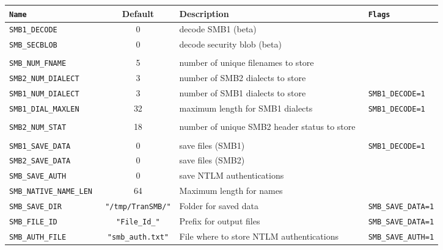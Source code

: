 \documentclass[documentation]{subfiles}
\begin{document}
\begin{longtable}{>{\tt}lcl>{\tt\small}l}
    \toprule
    {\bf Name} & {\bf Default} & {\bf Description} & {\bf Flags}\\
    \midrule\endhead%
    SMB1\_DECODE           & 0                                & decode SMB1 (beta)                                 & \\
    SMB\_SECBLOB           & 0                                & decode security blob (beta)                        & \\
    \\
    SMB\_NUM\_FNAME        & 5                                & number of unique filenames to store                & \\
    SMB2\_NUM\_DIALECT     & 3                                & number of SMB2 dialects to store                   & \\
    SMB1\_NUM\_DIALECT     & 3                                & number of SMB1 dialects to store                   & SMB1\_DECODE=1\\
    SMB1\_DIAL\_MAXLEN     & 32                               & maximum length for SMB1 dialects                   & SMB1\_DECODE=1\\
    \\
    SMB2\_NUM\_STAT        & 18                               & number of unique SMB2 header status to store       & \\
    \\
    SMB1\_SAVE\_DATA       & 0                                & save files (SMB1)                                  & SMB1\_DECODE=1\\
    SMB2\_SAVE\_DATA       & 0                                & save files (SMB2)                                  & \\
    SMB\_SAVE\_AUTH        & 0                                & save NTLM authentications                          & \\
    SMB\_NATIVE\_NAME\_LEN & 64                               & Maximum length for names                           & \\
    SMB\_SAVE\_DIR         & {\tt\small "/tmp/TranSMB/"}      & Folder for saved data                              & SMB\_SAVE\_DATA=1\\
    SMB\_FILE\_ID          & {\tt\small "File\_Id\_"}         & Prefix for output files                            & SMB\_SAVE\_DATA=1\\
    SMB\_AUTH\_FILE        & {\tt\small "smb\_auth.txt"}      & File where to store NTLM authentications           & SMB\_SAVE\_AUTH=1\\

\end{longtable}
\end{document}

